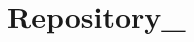 \chapter{Repository\+\_ }
\hypertarget{md__r_e_a_d_m_e}{}\label{md__r_e_a_d_m_e}
\label{md__r_e_a_d_m_e_autotoc_md0}%
%
